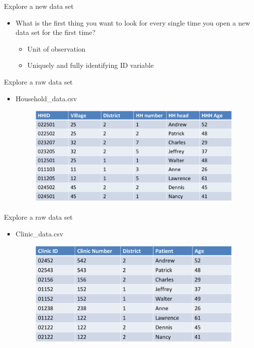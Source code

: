 \documentclass[aspectratio=169]{beamer}
\begin{document}
\begin{frame}{Explore a new data set}
\begin{itemize}
	\item What is the first thing you want to look for every single time you open a new data set for the first time?
		\begin{itemize}
			\item Unit of observation
			\item Uniquely and fully identifying ID variable
		\end{itemize}
\end{itemize}
\end{frame}



\begin{frame}{Explore a raw data set}
\begin{itemize}
	\item Household\_data.csv
	\begin{figure}
		\centering
		\includegraphics[width=\linewidth]{img/raw1}
	\end{figure}
\end{itemize}
\end{frame}



\begin{frame}{Explore a raw data set}
\begin{itemize}
	\item Clinic\_data.csv
	
	\begin{figure}
		\centering
		\includegraphics[width=\linewidth]{img/raw2}
	\end{figure}
\end{itemize}
\end{frame}
\end{document}
